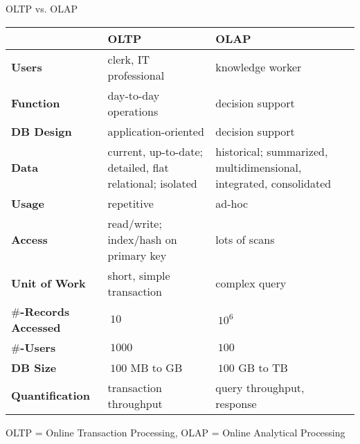 \begin{frame}{OLTP vs. OLAP}
	\vspace{-0.5em}
	\begin{tabularx}{\textwidth}{|b|X|X|}
		\hline
		\rowcolor{faugray!62}          & \textbf{OLTP}                                            & \textbf{OLAP}                                                      \\\hline
		\textbf{Users}                 & clerk, IT professional                                   & knowledge worker                                                   \\ \hline
		\textbf{Function}              & day-to-day operations                                    & decision support                                                   \\ \hline
		\textbf{DB Design}             & application-oriented                                     & decision support                                                   \\ \hline
		\textbf{Data}                  & current, up-to-date; detailed, flat relational; isolated & historical; summarized, multidimensional, integrated, consolidated \\ \hline
		\textbf{Usage}                 & repetitive                                               & ad-hoc                                                             \\ \hline
		\textbf{Access}                & read/write; index/hash on primary key                    & lots of scans                                                      \\ \hline
		\textbf{Unit of Work}          & short, simple transaction                                & complex query                                                      \\ \hline
		\textbf{$\#$-Records Accessed} & $~ 10$                                                   & $~ 10^6$                                                           \\ \hline
		\textbf{$\#$-Users}            & $~ 1000$                                                 & $~ 100$                                                            \\ \hline
		\textbf{DB Size}               & $~ 100$ MB to GB                                         & $~ 100$ GB to TB                                                   \\ \hline
		\textbf{Quantification}        & transaction throughput                                   & query throughput, response                                         \\ \hline
	\end{tabularx}

	\vspace*{5mm}

	{\small OLTP = Online Transaction Processing, OLAP = Online Analytical Processing}
\end{frame}

